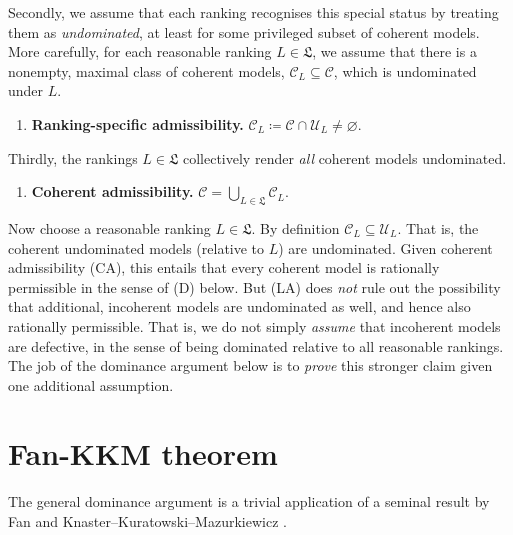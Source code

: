 \documentclass[11pt]{article}
\newcommand{\chg}[1]{{\color{red}#1}}
\theoremstyle{definition}
\theoremstyle{remark}
\newcommand{\C}{\mathcal C}
\newcommand{\U}{\mathcal U}
\begin{document}
Secondly, we assume that each ranking recognises this special status by treating them as \textit{undominated}, at least for some privileged subset of coherent models. More carefully, for each reasonable ranking $L\in\mathfrak L$,  we assume that there is a nonempty, maximal class of coherent models, $\C_L\subseteq\C$, which is undominated under $L$.
\begin{enumerate}[label=\textbf{(LA)},leftmargin=*]
\item \textbf{Ranking-specific admissibility.} $\C_L\coloneqq \C\cap\U_L\neq\varnothing$.
\end{enumerate}

Thirdly, the rankings $L\in\mathfrak L$ collectively render \textit{all} coherent models undominated.
\begin{enumerate}[label=\textbf{(CA)},leftmargin=*]
\item \textbf{Coherent admissibility.} $\C=\bigcup_{L\in\mathfrak L}\C_L$.
\end{enumerate}

Now choose a reasonable ranking $L\in\mathfrak L$. By definition $\C_L\subseteq\U_L$. That is, the coherent undominated models (relative to $L$) are undominated. Given coherent admissibility (CA), this entails that every coherent model is rationally permissible \chg{in the sense of (D) below}. But (LA) does \textit{not} rule out the possibility that additional, incoherent models are undominated as well, and hence also rationally permissible. That is, we do not simply \textit{assume} that incoherent models are defective, in the sense of being dominated relative to all reasonable rankings. The job of the dominance argument below is to \textit{prove} this stronger claim given one additional assumption.





\section{Fan-KKM theorem}\label{sec:kkm}

The general dominance argument is \chg{a} trivial application of a seminal result by Fan and Knaster--Kuratowski--Mazurkiewicz \cite[Theorem~17.46]{AliprantisBorder2006}.







\end{document}
